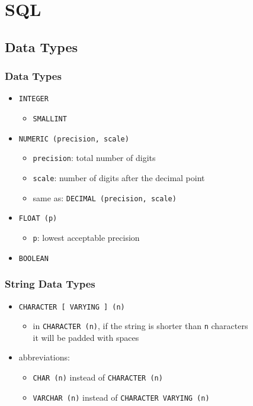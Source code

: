 \documentclass[dvipsnames]{beamer}
\theoremstyle{plain}
\begin{document}
\lstset{language=FullSQL}

\section{SQL}

\subsection{Data Types}

\begin{frame}
  \frametitle{Data Types}

  \begin{itemize}
    \item \texttt{INTEGER}
    \begin{itemize}
      \item \texttt{SMALLINT}
    \end{itemize}

    \pause
    \medskip
    \item \texttt{NUMERIC (precision, scale)}
    \begin{itemize}
      \item \texttt{precision}: total number of digits
      \item \texttt{scale}: number of digits after the decimal point
      \item same as: \texttt{DECIMAL (precision, scale)}
    \end{itemize}

    \pause
    \medskip
    \item \texttt{FLOAT (p)}
    \begin{itemize}
      \item \texttt{p}: lowest acceptable precision
    \end{itemize}

    \pause
    \medskip
    \item \texttt{BOOLEAN}
  \end{itemize}
\end{frame}

\begin{frame}
  \frametitle{String Data Types}

  \begin{itemize}
    \item \texttt{CHARACTER [ VARYING ] (n)}
    \begin{itemize}
      \item in \texttt{CHARACTER (n)}, if the string is shorter than
        \texttt{n} characters\\
        it will be padded with spaces
    \end{itemize}

    \pause
    \item abbreviations:
    \begin{itemize}
      \item \texttt{CHAR (n)} instead of \texttt{CHARACTER (n)}
      \item \texttt{VARCHAR (n)} instead of \texttt{CHARACTER VARYING (n)}
    \end{itemize}
  \end{itemize}
\end{frame}
\end{document}
